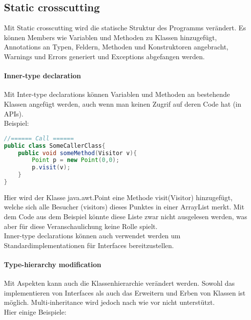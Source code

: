 

\subsection{Static crosscutting}

Mit Static crosscutting wird die statische Struktur des Programms verändert. Es können Members wie Variablen und Methoden zu Klassen hinzugefügt, Annotations an Typen, Feldern, Methoden und Konstruktoren angebracht, Warnings und Errors generiert und Exceptions abgefangen werden.

\paragraph{Inner-type declaration}

Mit Inter-type declarations können Variablen und Methoden an bestehende Klassen angefügt werden, auch wenn man keinen Zugrif auf deren Code hat (in APIs).\\
Beispiel:





\begin{lstlisting}[language=Java]
//====== Call ======
public class SomeCallerClass{
	public void someMethod(Visitor v){
		Point p = new Point(0,0);
		p.visit(v);
	}
}
\end{lstlisting}

Hier wird der Klasse java.awt.Point eine Methode visit(Visitor) hinzugefügt, welche sich alle Besucher (visitors) dieses Punktes in einer ArrayList merkt. Mit dem Code aus dem Beispiel könnte diese Liste zwar nicht ausgelesen werden, was aber für diese Veranschaulichung keine Rolle spielt.\\
Inner-type declarations können auch verwendet werden um Standardimplementationen für Interfaces bereitzustellen.

\paragraph{Type-hierarchy modification}
Mit Aspekten kann auch die Klassenhierarchie verändert werden. Sowohl das implementieren von Interfaces als auch das Erweitern und Erben von Klassen ist möglich. Multi-inheritance wird jedoch nach wie vor nicht unterstützt.\\
Hier einige Beispiele:\\

